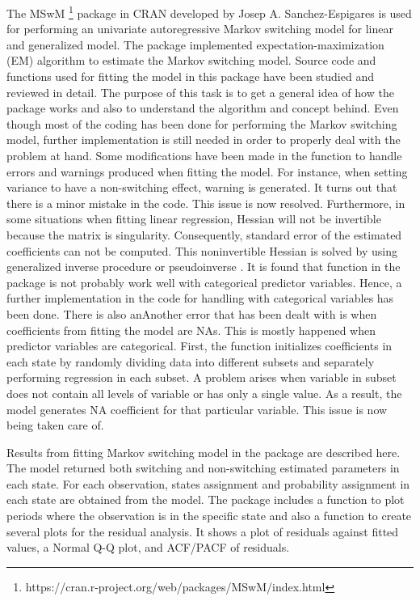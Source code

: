 \documentclass[]{article}
\begin{document}
The MSwM \footnote{https://cran.r-project.org/web/packages/MSwM/index.html} package in CRAN developed by Josep A. Sanchez-Espigares is used for performing an univariate autoregressive Markov switching model for linear and generalized model. The package implemented expectation-maximization (EM) algorithm to estimate the Markov switching model. Source code and functions used for fitting the model in this package have been studied and reviewed in detail. The purpose of this task is to get a general idea of how the package works and also to understand the algorithm and concept behind. Even though most of the coding has been done for performing the Markov switching model, further implementation is still needed in order to properly deal with the problem at hand. Some modifications have been made in the function to handle errors and warnings produced when fitting the model. For instance, when setting variance to have a non-switching effect, warning is generated. It turns out that there is a minor mistake in the code. This issue is now resolved. Furthermore, in some situations when fitting linear regression, Hessian will not be invertible because the matrix is singularity. Consequently, standard error of the estimated coefficients can not be computed. This noninvertible Hessian is solved by using generalized inverse procedure or pseudoinverse \cite{gill2004your}. It is found that function in the package is not probably work well with categorical predictor variables. Hence, a further implementation in the code for handling with categorical variables has been done. There is also anAnother error that has been dealt with is when coefficients from fitting the model are NAs. This is mostly happened when predictor variables are categorical. First, the function initializes coefficients in each state by randomly dividing data into different subsets and separately performing regression in each subset. A problem arises when variable in subset does not contain all levels of variable or has only a single value. As a result, the model generates NA coefficient for that particular variable. This issue is now being taken care of. 

Results from fitting Markov switching model in the package are described here. The model returned both switching and non-switching estimated parameters in each state. For each observation, states assignment and probability assignment in each state are obtained from the model. The package includes a function to plot periods where the observation is in the specific state and also a function to create several plots for the residual analysis. It shows a plot of residuals against fitted values, a Normal Q-Q plot, and ACF/PACF of residuals.



\end{document}
